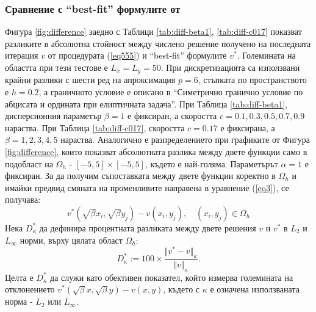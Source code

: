 \documentclass[a4paper]{article}
\newcommand{\be}{\begin{equation}}
\newcommand{\ee}{\end{equation}}
\newcommand{\rf}[1]{(\ref{#1})}
\theoremstyle{remark}
\begin{document}
\subsubsection{Сравнение с ``best-fit'' формулите от \cite{Ch2011} }
Фигура \ref{fig:difference} заедно с Таблици \ref{tab:diff-beta1}, \ref{tab:diff-c017} показват разликите в абсолютна стойност между числено решение получено на последната итерация $v$ от процедурата \rf{eq555} и ``best-fit'' формулите $v^*$. Големината на областта при тези тестове е $L_x = L_y = 50$. При дискретизацията са използвани крайни разлики с шести ред на апроксимация $p=6$, стъпката по пространството е $h=0.2$, а граничното условие е описано в ``Симетрично гранично условие по абцисата и ордината при елиптичната задача''. При Таблица \ref{tab:diff-beta1}, дисперсионния параметър $\beta=1$ е фиксиран, а скоростта $c = 0.1, 0.3, 0.5, 0.7, 0.9$ нараства. При Таблица \ref{tab:diff-c017}, скоростта $c = 0.17$ е фиксирана, а $\beta=1, 2, 3, 4, 5$ нараства. Аналогично е разпределението при графиките от Фигура \ref{fig:difference}, които показват абсолютната разлика между двете функции само в подобласт на $\Omega_h$ - $[-5,  5] \times [-5,5]$, където е най-голяма. Параметърът $\alpha = 1$ е фиксиран. За да получим съпоставката между двете функции коректно в $\Omega_h$ и имайки предвид смяната на променливите направена в уравнение \rf{eq3}, се получава:
\be
v^*\left(\sqrt{\beta}x_i,\sqrt{\beta}y_j\right)-v(x_i,y_j), \quad (x_i,y_j) \in \Omega_h
\ee
Нека $D^*_{\kappa}$ да дефинира процентната разликата между двете решения $v$ и $v^*$ в ${L_2 }$ и ${L_\infty}$ норми, върху цялата област $\Omega_h$:
\be\label{diffvv}
D^*_{\kappa} := 100 \times \frac{\Vert v^*-v \Vert_{\kappa} }{ \Vert v \Vert_{\kappa} }.
\ee
Целта е $D^*_{\kappa}$ да служи като обективен показател, който измерва големината на отклонението $v^*(\sqrt{\beta}x,\sqrt{\beta}y)-v(x,y)$, където с $\kappa$ е означена използваната норма - ${L_2 }$ или ${L_\infty}$.
\end{document}
